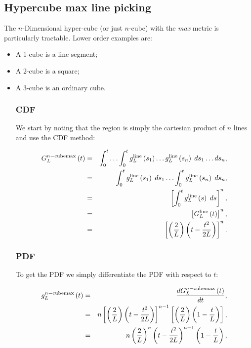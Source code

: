 \subsection{Hypercube max line picking}
\label{sec:hypercubemax_line}

The $n$-Dimensional hyper-cube (or just $n$-cube) with the {\em max} metric is particularly tractable.
Lower order examples are:
\begin{itemize}

\item A 1-cube is a line segment;

\item A 2-cube is a square;

\item A 3-cube is an ordinary cube.


\subsubsection{CDF}

We start by noting that the region is simply the cartesian product of $n$ lines and use the CDF method:

\begin{eqnarray}
 G^{n-{\rm cube max}}_L\left(t\right) & = & \int_{0}^{t} \ldots \int_{0}^{t}   g^{\rm line}_L\left(s_{1}\right)\ldots g^{\rm line}_L\left(s_{n}\right) \;ds_{1}\ldots ds_{n}, \nonumber \\
 & = & \int_{0}^{t}  g^{\rm line}_L\left(s_{1}\right) \;ds_{1}   \ldots \int_{0}^{t} g^{\rm line}_L\left(s_{n}\right) \;ds_{n},\nonumber \\
 & = & \left[\int_{0}^{t}  g^{\rm line}_L\left(s\right) \;ds \right]^{n},\nonumber \\
 & = & \left[G^{\rm line}_L\left(t\right)\right]^{n} ,\nonumber \\
 & = &  \left[\left(\frac{2}{L}\right)\left( t - \frac{t^2}{2L} \right)\right]^{n}.
\end{eqnarray}

\subsubsection{PDF}
To get the PDF we simply differentiate the PDF with respect to $t$:

\begin{eqnarray}
 g^{n-{\rm cube max}}_L\left(t\right) & = & \frac{d G^{n-{\rm cube max}}_L\left(t\right)}{dt},\nonumber \\
& = &  n\left[\left(\frac{2}{L}\right)\left( t - \frac{t^2}{2L} \right)\right]^{n-1} \left[\left(\frac{2}{L}\right)\left( 1 - \frac{t}{L} \right)\right],\nonumber \\
& = &  n\left(\frac{2}{L}\right)^{n} \left( t - \frac{t^2}{2L} \right)^{n-1}\left( 1 - \frac{t}{L} \right), \nonumber \\
\end{eqnarray} 
 

\end{itemize}
